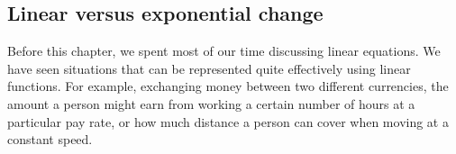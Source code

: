 %
%
%
%
%
%


\subsection{Linear versus exponential change}

Before this chapter, we spent most of our time discussing linear equations. We have seen situations that can be represented quite effectively using linear functions. For example, exchanging money between two different currencies, the amount a person might earn from working a certain number of hours at a particular pay rate, or how much distance a person can cover when moving at a constant speed.

